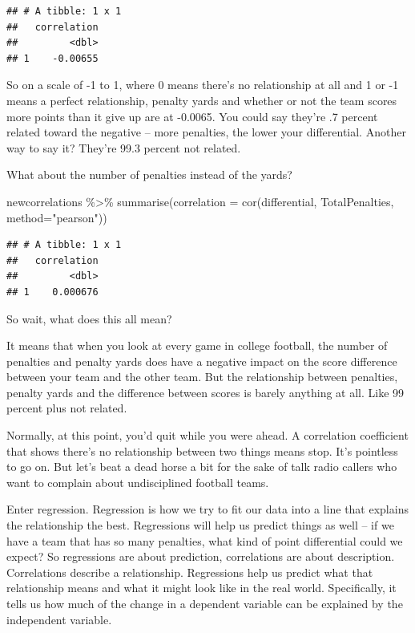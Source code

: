 \documentclass[
]{book}
\newenvironment{Shaded}{\begin{snugshade}}{\end{snugshade}}
\newcommand{\AttributeTok}[1]{\textcolor[rgb]{0.77,0.63,0.00}{#1}}
\newcommand{\FunctionTok}[1]{\textcolor[rgb]{0.00,0.00,0.00}{#1}}
\newcommand{\NormalTok}[1]{#1}
\newcommand{\SpecialCharTok}[1]{\textcolor[rgb]{0.00,0.00,0.00}{#1}}
\newcommand{\StringTok}[1]{\textcolor[rgb]{0.31,0.60,0.02}{#1}}
\begin{document}
\begin{verbatim}
## # A tibble: 1 x 1
##   correlation
##         <dbl>
## 1    -0.00655
\end{verbatim}

So on a scale of -1 to 1, where 0 means there's no relationship at all and 1 or -1 means a perfect relationship, penalty yards and whether or not the team scores more points than it give up are at -0.0065. You could say they're .7 percent related toward the negative -- more penalties, the lower your differential. Another way to say it? They're 99.3 percent not related.

What about the number of penalties instead of the yards?

\begin{Shaded}
\begin{Highlighting}[]
\NormalTok{newcorrelations }\SpecialCharTok{\%\textgreater{}\%} 
  \FunctionTok{summarise}\NormalTok{(}\AttributeTok{correlation =} \FunctionTok{cor}\NormalTok{(differential, TotalPenalties, }\AttributeTok{method=}\StringTok{"pearson"}\NormalTok{))}
\end{Highlighting}
\end{Shaded}

\begin{verbatim}
## # A tibble: 1 x 1
##   correlation
##         <dbl>
## 1    0.000676
\end{verbatim}

So wait, what does this all mean?

It means that when you look at every game in college football, the number of penalties and penalty yards does have a negative impact on the score difference between your team and the other team. But the relationship between penalties, penalty yards and the difference between scores is barely anything at all. Like 99 percent plus not related.

Normally, at this point, you'd quit while you were ahead. A correlation coefficient that shows there's no relationship between two things means stop. It's pointless to go on. But let's beat a dead horse a bit for the sake of talk radio callers who want to complain about undisciplined football teams.

Enter regression. Regression is how we try to fit our data into a line that explains the relationship the best. Regressions will help us predict things as well -- if we have a team that has so many penalties, what kind of point differential could we expect? So regressions are about prediction, correlations are about description. Correlations describe a relationship. Regressions help us predict what that relationship means and what it might look like in the real world. Specifically, it tells us how much of the change in a dependent variable can be explained by the independent variable.
\end{document}

